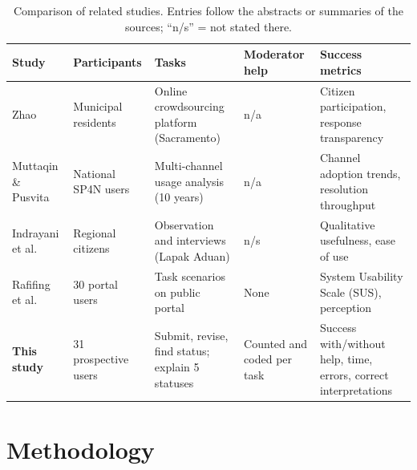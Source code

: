 \documentclass[11pt, runningheads, a4paper]{llncs}
\newcommand{\rev}[1]{#1}
\begin{document}
\begin{table}[!htbp]
\caption{Comparison of related studies. Entries follow the abstracts or summaries
of the sources; ``n/s'' = not stated there.}
\label{tab:related}
\centering
\scriptsize
\setlength{\tabcolsep}{4pt}
\renewcommand{\arraystretch}{1.15}
\begin{tabularx}{\textwidth}{@{}L{2.5cm} Y Y L{1.8cm} Y@{}}
\toprule
Study & Participants & Tasks & Moderator help & Success metrics \\
\midrule
Zhao~\cite{zhao2023} & Municipal residents & Online crowdsourcing platform (Sacramento) & n/a & Citizen participation, response transparency \\
\addlinespace[1pt]
Muttaqin \& Pusvita~\cite{muttaqin2023} & National SP4N users & Multi-channel usage analysis (10 years) & n/a & Channel adoption trends, resolution throughput \\
\addlinespace[1pt]
Indrayani et al.~\cite{indrayani2025} & Regional citizens & Observation and interviews (Lapak Aduan) & n/s & Qualitative usefulness, ease of use \\
\addlinespace[1pt]
Rafifing et al.~\cite{rafifing2022} & 30 portal users & Task scenarios on public portal & None & System Usability Scale (SUS), perception \\
\addlinespace[1pt]
\textbf{This study} & \rev{31 prospective users} & Submit, revise, find status; explain 5 statuses & Counted and coded per task & Success with/without help, time, errors, correct interpretations \\
\bottomrule
\end{tabularx}
\end{table}

\section{Methodology}
\end{document}
